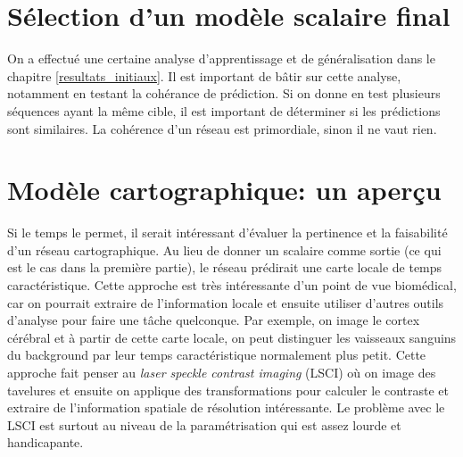 \documentclass[MSc,french]{ulthese}
\begin{document}
\section{Sélection d'un modèle scalaire final}
On a effectué une certaine analyse d'apprentissage et de généralisation dans le chapitre \ref{resultats_initiaux}. Il est important de bâtir sur cette analyse, notamment en testant la cohérance de prédiction. Si on donne en test plusieurs séquences ayant la même cible, il est important de déterminer si les prédictions sont similaires. La cohérence d'un réseau est primordiale, sinon il ne vaut rien.
\section{Modèle cartographique: un aperçu}
Si le temps le permet, il serait intéressant d'évaluer la pertinence et la faisabilité d'un réseau cartographique. Au lieu de donner un scalaire comme sortie (ce qui est le cas dans la première partie), le réseau prédirait une carte locale de temps caractéristique. Cette approche est très intéressante d'un point de vue biomédical, car on pourrait extraire de l'information locale et ensuite utiliser d'autres outils d'analyse pour faire une tâche quelconque. Par exemple, on image le cortex cérébral et à partir de cette carte locale, on peut distinguer les vaisseaux sanguins du background par leur temps caractéristique normalement plus petit. Cette approche fait penser au \textit{laser speckle contrast imaging} (LSCI) où on image des tavelures et ensuite on applique des transformations pour calculer le contraste et extraire de l'information spatiale de résolution intéressante. Le problème avec le LSCI est surtout au niveau de la paramétrisation qui est assez lourde et handicapante.















\newpage
 
\end{document}
